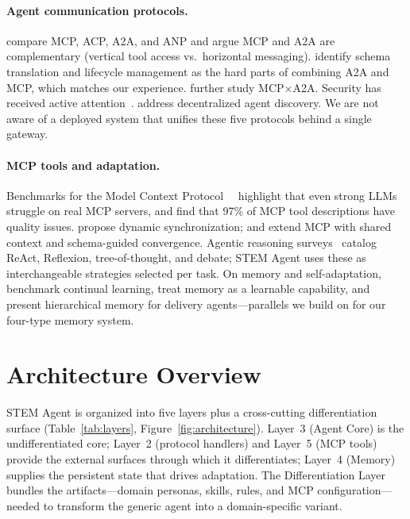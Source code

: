 \documentclass[11pt]{article}
\begin{document}
\paragraph{Agent communication protocols.}
\citet{ehtesham2025survey} compare MCP, ACP, A2A, and ANP and argue MCP and A2A are complementary (vertical tool access vs.\ horizontal messaging). \citet{li2025gluetoprotocols} identify schema translation and lifecycle management as the hard parts of combining A2A and MCP, which matches our experience. \citet{jeong2025mcpa2a} further study MCP$\times$A2A. Security has received active attention~\citep{habler2025a2a, anbiaee2026security, sarkar2025mcpsurvey}. \citet{chang2025anp} address decentralized agent discovery. We are not aware of a deployed system that unifies these five protocols behind a single gateway.

\paragraph{MCP tools and adaptation.}
Benchmarks for the Model Context Protocol~\citep{anthropic2024mcp}~\citep{luo2025mcpuniverse, fan2025mcptoolbench} highlight that even strong LLMs struggle on real MCP servers, and \citet{hasan2026mcpsmells} find that 97\% of MCP tool descriptions have quality issues. \citet{lumer2025scalemcp} propose dynamic synchronization; \citet{jayanti2026enhancing} and \citet{schlapbach2026convergence} extend MCP with shared context and schema-guided convergence. Agentic reasoning surveys~\citep{wei2026agentic, alomrani2025reasoning, li2025budget} catalog ReAct, Reflexion, tree-of-thought, and debate; STEM Agent uses these as interchangeable strategies selected per task. On memory and self-adaptation, \citet{ai2025memorybench} benchmark continual learning, \citet{gallego2026memoryastool} treat memory as a learnable capability, and \citet{yadav2026synapse} present hierarchical memory for delivery agents---parallels we build on for our four-type memory system.

\section{Architecture Overview}
\label{sec:architecture}

STEM Agent is organized into five layers plus a cross-cutting differentiation surface (Table~\ref{tab:layers}, Figure~\ref{fig:architecture}). Layer~3 (Agent Core) is the undifferentiated core; Layer~2 (protocol handlers) and Layer~5 (MCP tools) provide the external surfaces through which it differentiates; Layer~4 (Memory) supplies the persistent state that drives adaptation. The Differentiation Layer bundles the artifacts---domain personas, skills, rules, and MCP configuration---needed to transform the generic agent into a domain-specific variant.
\end{document}
